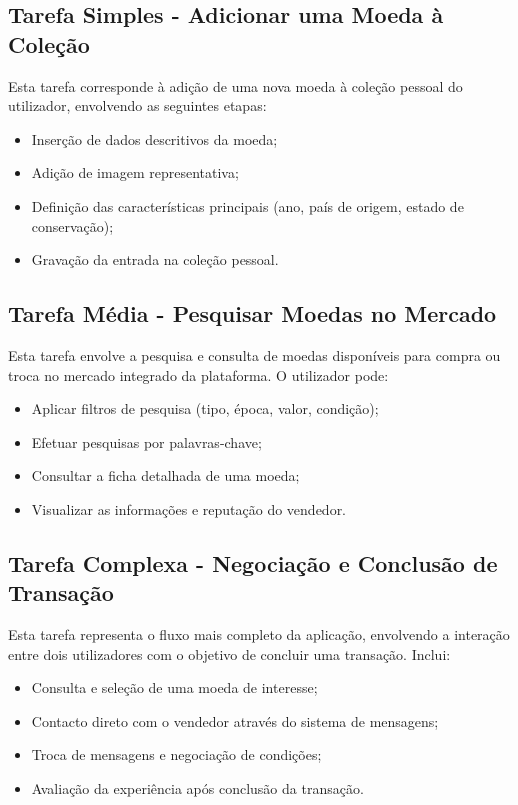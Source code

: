 \documentclass[12pt,a4paper]{article}
\begin{document}
\subsection{Tarefa Simples - Adicionar uma Moeda à Coleção}

Esta tarefa corresponde à adição de uma nova moeda à coleção pessoal do utilizador, envolvendo as seguintes etapas:

\begin{itemize}
\setlength{\itemsep}{0.15em}
\item Inserção de dados descritivos da moeda;
\item Adição de imagem representativa;
\item Definição das características principais (ano, país de origem, estado de conservação);
\item Gravação da entrada na coleção pessoal.
\end{itemize}

\subsection{Tarefa Média - Pesquisar Moedas no Mercado}

Esta tarefa envolve a pesquisa e consulta de moedas disponíveis para compra ou troca no mercado integrado da plataforma. O utilizador pode:

\begin{itemize}
\setlength{\itemsep}{0.15em}
\item Aplicar filtros de pesquisa (tipo, época, valor, condição);
\item Efetuar pesquisas por palavras-chave;
\item Consultar a ficha detalhada de uma moeda;
\item Visualizar as informações e reputação do vendedor.
\end{itemize}

\subsection{Tarefa Complexa - Negociação e Conclusão de Transação}

Esta tarefa representa o fluxo mais completo da aplicação, envolvendo a interação entre dois utilizadores com o objetivo de concluir uma transação. Inclui:

\begin{itemize}
\setlength{\itemsep}{0.15em}
\item Consulta e seleção de uma moeda de interesse;
\item Contacto direto com o vendedor através do sistema de mensagens;
\item Troca de mensagens e negociação de condições;
\item Avaliação da experiência após conclusão da transação.
\end{itemize}
\end{document}
